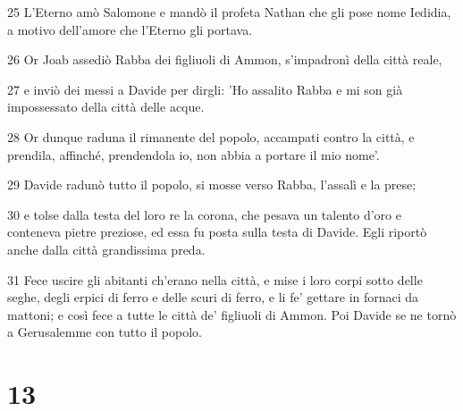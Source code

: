 \par 25 L'Eterno amò Salomone e mandò il profeta Nathan che gli pose nome Iedidia, a motivo dell'amore che l'Eterno gli portava.
\par 26 Or Joab assediò Rabba dei figliuoli di Ammon, s'impadronì della città reale,
\par 27 e inviò dei messi a Davide per dirgli: 'Ho assalito Rabba e mi son già impossessato della città delle acque.
\par 28 Or dunque raduna il rimanente del popolo, accampati contro la città, e prendila, affinché, prendendola io, non abbia a portare il mio nome'.
\par 29 Davide radunò tutto il popolo, si mosse verso Rabba, l'assalì e la prese;
\par 30 e tolse dalla testa del loro re la corona, che pesava un talento d'oro e conteneva pietre preziose, ed essa fu posta sulla testa di Davide. Egli riportò anche dalla città grandissima preda.
\par 31 Fece uscire gli abitanti ch'erano nella città, e mise i loro corpi sotto delle seghe, degli erpici di ferro e delle scuri di ferro, e li fe' gettare in fornaci da mattoni; e così fece a tutte le città de' figliuoli di Ammon. Poi Davide se ne tornò a Gerusalemme con tutto il popolo.

\chapter{13}

